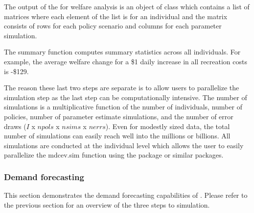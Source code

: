 The output of the  for welfare analysis is an object of
class  which contains a list of matrices where each
element of the list is for an individual and the matrix consists of rows
for each policy scenario and columns for each parameter simulation.

The summary function computes summary statistics across all individuals.
For example, the average welfare change for a \$1 daily increase in all
recreation costs is -\$129.

The reason these last two steps are separate is to allow users to
parallelize the simulation step as the last step can be computationally
intensive. The number of simulations is a multiplicative function of the
number of individuals, number of policies, number of parameter estimate
simulations, and the number of error draws (\(I\) x \(npols\) x
\(nsims\) x \(nerrs\)). Even for modestly sized data, the total number
of simulations can easily reach well into the millions or billions. All
simulations are conducted at the individual level which allows the user
to easily parallelize the mdcev.sim function using the 
package or similar packages.

\hypertarget{demand-forecasting}{%
\subsubsection{Demand forecasting}\label{demand-forecasting}}

This section demonstrates the demand forecasting capabilities of
. Please refer to the previous section for an overview of
the three steps to simulation.

